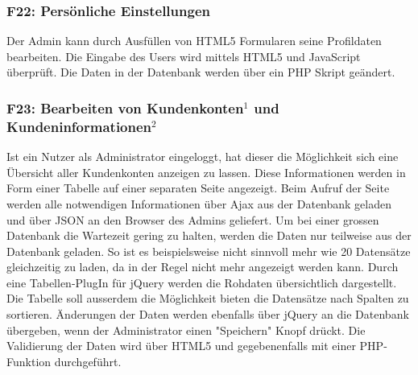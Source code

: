 \documentclass[10pt,a4paper]{scrartcl}
\begin{document}
\subsubsection*{F22: Persönliche Einstellungen}

Der Admin kann durch Ausfüllen von HTML5 Formularen seine Profildaten bearbeiten. Die Eingabe des Users wird mittels HTML5 und JavaScript überprüft. Die Daten in der Datenbank werden über ein PHP Skript geändert.

\subsubsection*{F23: Bearbeiten von Kundenkonten$^1$ und Kundeninformationen$^2$}

Ist ein Nutzer als Administrator eingeloggt, hat dieser die Möglichkeit sich eine Übersicht aller Kundenkonten anzeigen zu lassen. Diese Informationen werden in Form einer Tabelle auf
einer separaten Seite angezeigt. Beim Aufruf der Seite werden alle notwendigen Informationen
über Ajax aus der Datenbank geladen und über JSON an den Browser des Admins geliefert. Um
bei einer grossen Datenbank die Wartezeit gering zu halten, werden die Daten nur teilweise
aus der Datenbank geladen. So ist es beispielsweise nicht sinnvoll mehr wie 20 Datensätze
gleichzeitig zu laden, da in der Regel nicht mehr angezeigt werden kann.
\newline \newline
Durch eine Tabellen-PlugIn für jQuery werden die Rohdaten übersichtlich dargestellt.
Die Tabelle soll ausserdem die Möglichkeit bieten die Datensätze nach Spalten zu sortieren.
\newline \newline
Änderungen der Daten werden ebenfalls über jQuery an die Datenbank übergeben, wenn der Administrator
einen "Speichern" Knopf drückt.
\newline \newline
Die Validierung der Daten wird über HTML5 und gegebenenfalls mit einer PHP-Funktion durchgeführt.
\end{document}
